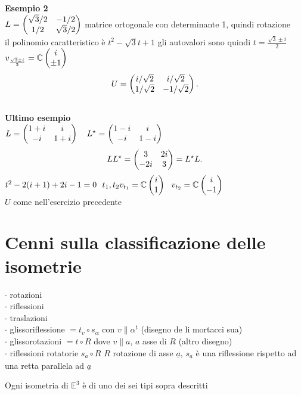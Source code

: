 \documentclass[12px]{article}
\begin{document}
	\textbf{Esempio 2}\\
		$L = \begin{pmatrix}\sqrt{3}/2&-1/2\\1/2&\sqrt{3}/2\end{pmatrix}$ matrice ortogonale con determinante 1, quindi rotazione\\
		il polinomio caratteristico è $t^2 - \sqrt 3 t + 1$ gli autovalori sono quindi $t = \frac {\sqrt{3}\pm i}{2}$
		$v_{\frac {\sqrt{3}\pm i}{2}} = \mathbb{C}\begin{pmatrix}i\\\pm 1\end{pmatrix}$
		 \[
			 U = \begin{pmatrix}i/\sqrt 2 & i/\sqrt 2\\ 1/\sqrt 2 & - 1/\sqrt 2\end{pmatrix}
		.\] 
		\hline \ \\[10px]
		\textbf{Ultimo esempio}\\[8px]
			 $L = \matrice{1 +i&i\\-i&1+i} \ \ \ L^\star = \matrice{1-i&i\\-i&1-i}\\$
			 \[
				 LL^\star = \begin{pmatrix}3&2i\\-2i&3\end{pmatrix} = L^\star L
			 .\] 
			 $t^2 - 2(i + 1) + 2i - 1 = 0\ \ t_1,t_2\\
			 v_{t_1} = \mathbb{C}\begin{pmatrix}i\\1\end{pmatrix} \ \ v_{t_2} = \mathbb{C}\begin{pmatrix}i\\-1\end{pmatrix}$\\
			 $U$ come nell'esercizio precedente
	\section{Cenni sulla classificazione delle isometrie}
	\begin{nome}
	$\cdot$ rotazioni\\
	$\cdot$ riflessioni\\
	$\cdot$ traslazioni\\
	$\cdot$ glissoriflessione $ = t_v\circ s_\alpha$ con $v\parallel \alpha^t$ (disegno de li mortacci sua)\\
$\cdot$ glissorotazioni $= t\circ R$ dove $v \parallel a$, $a$ asse di $R$ (altro disegno)\\
$\cdot$ riflessioni rotatorie $s_a\circ R$  $R$ rotazione di asse $\underline{a}$,  $s_\underline{a}$ è una riflessione rispetto ad una retta parallela ad $\underline{a}$
\end{nome}
\begin{teo}[Eulero 1776]
	Ogni isometria di $\mathbb{E}^3$ è di uno dei sei tipi sopra descritti
\end{teo}
\end{document}
